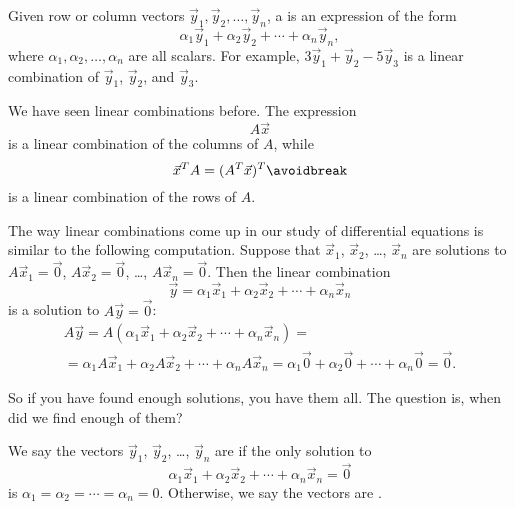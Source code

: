 Given row or column vectors $\vec{y}_1, \vec{y}_2, \ldots, \vec{y}_n$,
a \emph{} is an expression of the form
\begin{equation*}
\alpha_1 \vec{y}_1 + 
\alpha_2 \vec{y}_2 + 
\cdots +
\alpha_n \vec{y}_n ,
\end{equation*}
where $\alpha_1, \alpha_2, \ldots, \alpha_n$ are all scalars.
For example,
$3 \vec{y}_1 + \vec{y}_2 - 5 \vec{y}_3$ is a linear combination
of $\vec{y}_1$, $\vec{y}_2$, and $\vec{y}_3$.

We have seen linear combinations before.  The expression
\begin{equation*}
A \vec{x}
\end{equation*}
is a linear combination of the columns of $A$, while
\begin{equation*}
\vec{x}^T A = (A^T \vec{x})^T
\avoidbreak
\end{equation*}
is a linear combination of the rows of $A$.

The way linear combinations come up in our study of differential
equations is similar to the following computation.  Suppose that
$\vec{x}_1$, $\vec{x}_2$, \ldots, $\vec{x}_n$ are solutions
to $A \vec{x}_1 = \vec{0}$, 
$A \vec{x}_2 = \vec{0}$, \ldots,
$A \vec{x}_n = \vec{0}$.
Then the linear combination
\begin{equation*}
\vec{y} = \alpha_1 \vec{x}_1 + 
\alpha_2 \vec{x}_2 + 
\cdots +
\alpha_n \vec{x}_n 
\end{equation*}
is a solution to $A \vec{y} = \vec{0}$:
\begin{multline*}
A \vec{y} =
A (\alpha_1 \vec{x}_1 + 
\alpha_2 \vec{x}_2 + 
\cdots +
\alpha_n \vec{x}_n )
=
\\
=
\alpha_1 A \vec{x}_1 + 
\alpha_2 A \vec{x}_2 + 
\cdots +
\alpha_n A \vec{x}_n
=
\alpha_1 \vec{0} + 
\alpha_2 \vec{0} + 
\cdots +
\alpha_n \vec{0} = \vec{0} .
\end{multline*}

So if you have found enough solutions, you have them all.  The question is,
when did we find enough of them?

We say the vectors $\vec{y}_1$, $\vec{y}_2$, \ldots, $\vec{y}_n$ are
\emph{} if the only solution to
\begin{equation*}
\alpha_1 \vec{x}_1 + 
\alpha_2 \vec{x}_2 + 
\cdots +
\alpha_n \vec{x}_n 
=
\vec{0}
\end{equation*}
is $\alpha_1 = \alpha_2 = \cdots = \alpha_n = 0$.
Otherwise, we say the vectors are \emph{}.


